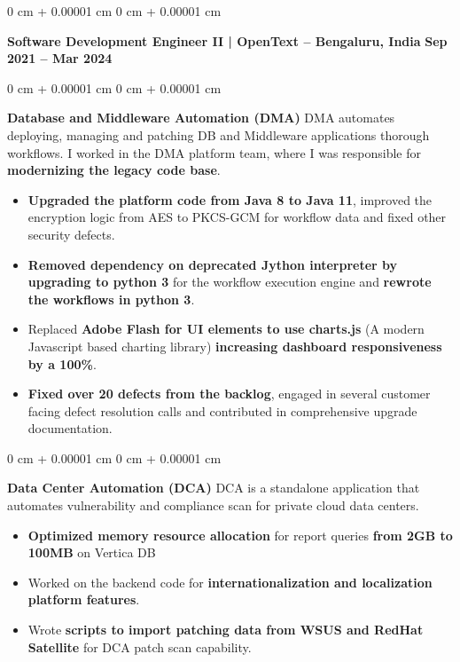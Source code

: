 \documentclass[10pt, letterpaper]{article}
\newenvironment{highlights}{
    \begin{itemize}[
        topsep=0.10 cm,
        parsep=0.10 cm,
        partopsep=0pt,
        itemsep=0pt,
        leftmargin=0 cm + 10pt
    ]
}{
    \end{itemize}
} %
\newenvironment{onecolentry}{
    \begin{adjustwidth}{
        0 cm + 0.00001 cm
    }{
        0 cm + 0.00001 cm
    }
}{
    \end{adjustwidth}
} %
\newenvironment{twocolentry}[2][]{
    \onecolentry
    \def\secondColumn{#2}
    \setcolumnwidth{\fill, 4.5 cm}
    \begin{paracol}{2}
}{
    \switchcolumn \raggedleft \secondColumn
    \end{paracol}
    \endonecolentry
} %
\begin{document}
        \begin{twocolentry}{
            \textbf{Sep 2021 – Mar 2024}
        }
            {\textbf{{\color{MidnightBlue}Software Development Engineer II} |  OpenText -- Bengaluru, India}}\end{twocolentry}
        \vspace{0.20 cm}
        \begin{onecolentry}
            \textbf{Database and Middleware Automation (DMA)}
            \newline DMA automates deploying, managing and patching DB and Middleware applications thorough workflows. I worked in the DMA platform team, where I was responsible for \textbf{modernizing the legacy code base}.
            \begin{highlights}
                \item \textbf{Upgraded the platform code from Java 8 to Java 11}, improved the encryption logic from AES to PKCS-GCM for workflow data and fixed other security defects.
                \item \textbf{Removed dependency on deprecated Jython interpreter by upgrading to python 3} for the workflow execution engine and \textbf{rewrote the workflows in python 3}.
                \item Replaced \textbf{Adobe Flash for UI elements to use charts.js} (A modern Javascript based charting library) \textbf{increasing dashboard responsiveness by a 100\%}.
                \item \textbf{Fixed over 20 defects from the backlog}, engaged in several customer facing defect resolution calls and contributed in comprehensive upgrade documentation.
            \end{highlights}
        \end{onecolentry}

         \vspace{0.20 cm}
        \begin{onecolentry}
            \textbf{Data Center Automation (DCA)}
            \newline DCA is a standalone application that automates vulnerability and compliance scan for private cloud data centers.
            \begin{highlights}
                \item \textbf{Optimized memory resource allocation} for report queries \textbf{from 2GB to 100MB} on Vertica DB
                \item Worked on the backend code for \textbf{internationalization and localization platform features}.
                \item Wrote \textbf{scripts to import patching data from WSUS and RedHat Satellite} for DCA patch scan capability.
            \end{highlights}
        \end{onecolentry}
\end{document}
